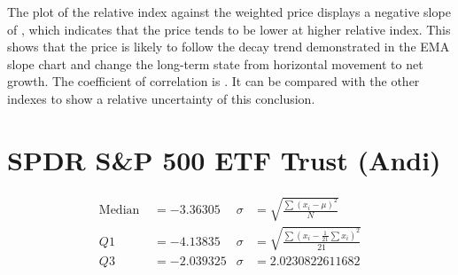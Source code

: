 \documentclass{article}
\begin{document}
\begin{center}
\end{center}
The plot of the relative index against the weighted price displays a negative slope of  , which indicates that the price tends to be lower at higher relative index. This shows that the price is likely to follow the decay trend demonstrated in the EMA slope chart and change the long-term state from horizontal movement to net growth. The coefficient of correlation is . It can be compared with the other indexes to show a relative uncertainty of this conclusion.


\pagebreak
\section{SPDR S\&P 500 ETF Trust (Andi)}

\begin{align*}
    \text{Median }&=-3.36305    &        \sigma&=\sqrt{\frac{\sum\left(x_i-\mu\right)^2}{N}}\\
    Q1&=-4.13835     &  \sigma    &=\sqrt{\frac{\sum\left(x_i-\frac{1}{21}\sum x_i\right)^2}{21}}\\
    Q3&=-2.039325 &        \sigma &=2.0230822611682
\end{align*}
\end{document}
